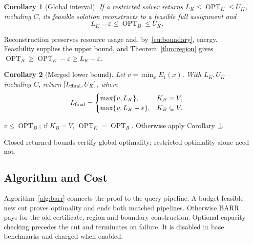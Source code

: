 \documentclass[conference]{IEEEtran}
\newtheorem{corollary}{Corollary}
\newcommand{\opt}{\operatorname{OPT}}
\newcommand{\eps}{\varepsilon}
\begin{document}
\begin{corollary}[Global interval]\label{cor:interval}
If a restricted solver returns $L_K\leq\opt_K\leq U_K$, including $C$, its feasible solution reconstructs to a feasible full assignment and
\begin{equation}
 L_K-\eps\leq\opt_B\leq U_K.
\end{equation}
\end{corollary}
\begin{IEEEproof}
Reconstruction preserves resource usage and, by~\eqref{eq:boundary}, energy. Feasibility supplies the upper bound, and Theorem~\ref{thm:region} gives $\opt_B\geq\opt_K-\eps\geq L_K-\eps$.
\end{IEEEproof}
\begin{corollary}[Merged lower bound]\label{cor:merged}
Let $v=\min_x E_1(x)$. With $L_K,U_K$ including $C$, return $[L_{\rm final},U_K]$, where
\begin{equation}
 L_{\rm final}=\begin{cases}
 \max\{v,L_K\},&K_B=V,\\
 \max\{v,L_K-\eps\},&K_B\subsetneq V.
 \end{cases}\label{eq:merged}
\end{equation}
\end{corollary}
\begin{IEEEproof}
$v\le\opt_B$; if $K_B=V$, $\opt_K=\opt_B$. Otherwise apply Corollary~\ref{cor:interval}.
\end{IEEEproof}
Closed returned bounds certify global optimality; restricted optimality alone need not.

\subsection{Algorithm and Cost}
Algorithm~\ref{alg:barr} connects the proof to the query pipeline. A budget-feasible new cut proves optimality and ends both matched pipelines. Otherwise BARR pays for the old certificate, region and boundary construction. Optional capacity checking precedes the cut and terminates on failure. It is disabled in base benchmarks and charged when enabled.
\end{document}
